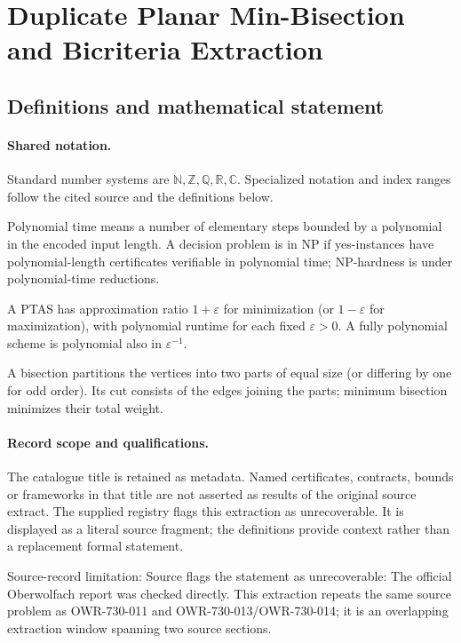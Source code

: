 \documentclass[11pt]{article}
\begin{document}
\section{Duplicate Planar Min-Bisection and Bicriteria Extraction}\label{statement}

\subsection{Definitions and mathematical statement}

\paragraph{Shared notation.}Standard number systems are $\mathbb N,\mathbb Z,\mathbb Q,\mathbb R,\mathbb C$. Specialized notation and index ranges follow the cited source and the definitions below.


Polynomial time means a number of elementary steps bounded by a polynomial in the encoded input length. A decision problem is in $\mathrm{NP}$ if yes-instances have polynomial-length certificates verifiable in polynomial time; NP-hardness is under polynomial-time reductions.

A PTAS has approximation ratio $1+\varepsilon$ for minimization (or $1-\varepsilon$ for maximization), with polynomial runtime for each fixed $\varepsilon>0$. A fully polynomial scheme is polynomial also in $\varepsilon^{-1}$.

A bisection partitions the vertices into two parts of equal size (or differing by one for odd order). Its cut consists of the edges joining the parts; minimum bisection minimizes their total weight.
\paragraph{Record scope and qualifications.}
The catalogue title is retained as metadata. Named certificates, contracts, bounds or frameworks in that title are not asserted as results of the original source extract.
The supplied registry flags this extraction as unrecoverable. It is displayed as a literal source fragment; the definitions provide context rather than a replacement formal statement.

Source-record limitation: Source flags the statement as unrecoverable: The official Oberwolfach report was checked directly. This extraction repeats the same source problem as OWR-730-011 and OWR-730-013/OWR-730-014; it is an overlapping extraction window spanning two source sections.
\end{document}
